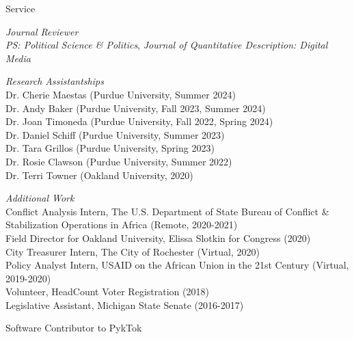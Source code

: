 \documentclass{resume} %
\begin{document}
\begin{rSection}{Service}

{\it Journal Reviewer}
\\\textit{PS: Political Science \& Politics}, \textit{Journal of Quantitative Description: Digital Media}

{\it Research Assistantships} 
\\Dr. Cherie Maestas (Purdue University, Summer 2024)
\\Dr. Andy Baker (Purdue University, Fall 2023, Summer 2024)
\\Dr. Joan Timoneda (Purdue University, Fall 2022, Spring 2024)
\\Dr. Daniel Schiff (Purdue University, Summer 2023)
\\Dr. Tara Grillos (Purdue University, Spring 2023)
\\Dr. Rosie Clawson (Purdue University, Summer 2022)
\\Dr. Terri Towner (Oakland University, 2020)

{\it Additional Work} 
\\Conflict Analysis Intern, The U.S. Department of State Bureau of Conflict \& Stabilization Operations in Africa (Remote, 2020-2021)
\\Field Director for Oakland University, Elissa Slotkin for Congress (2020)
\\City Treasurer Intern, The City of Rochester (Virtual, 2020)
\\Policy Analyst Intern, USAID on the African Union in the 21st Century (Virtual, 2019-2020)
\\Volunteer, HeadCount Voter Registration (2018)
\\Legislative Assistant, Michigan State Senate (2016-2017)


\end{rSection}



\begin{rSection}{Software} 
Contributor to PykTok \href{https://github.com/dfreelon/pyktok}{} 
\end{rSection}



\end{document}
